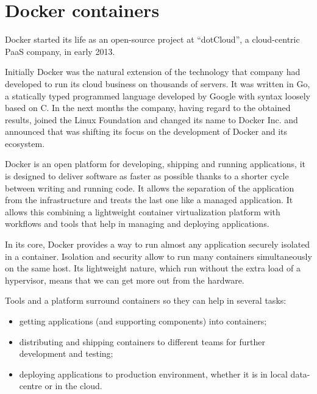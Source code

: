 %
%
\section{Docker containers}
\label{sec:background-docker}
Docker started its life as an open-source project at “dotCloud”, a cloud-centric PaaS company, in early
2013.

Initially Docker was the natural extension of the technology that company had developed to run its cloud
business on thousands of servers. It was written in Go, a statically typed programmed language developed
by Google with syntax loosely based on C. In the next months the company, having regard to the obtained
results, joined the Linux Foundation and changed its name to Docker Inc. and announced that was shifting
its focus on the development of Docker and its ecosystem.

Docker is an open platform for developing, shipping and running applications, it is designed to deliver
software as faster as possible thanks to a shorter cycle between writing and running code. It allows the
separation of the application from the infrastructure and treats the last one like a managed application.
It allows this combining a lightweight container virtualization platform with workflows and tools
that help in managing and deploying applications.

In its core, Docker provides a way to run almost any application securely isolated in a container.
Isolation and security allow to run many containers simultaneously on the same host. Its lightweight
nature, which run without the extra load of a hypervisor, means that we can get more out from the
hardware.

Tools and a platform surround containers so they can help in several tasks:

\begin{itemize}
	\item{getting applications (and supporting components) into containers;}
	\item{distributing and shipping containers to different teams for further development and testing;}
	\item{deploying applications to production environment, whether it is in local data-centre or in the
		cloud.}
\end{itemize}

